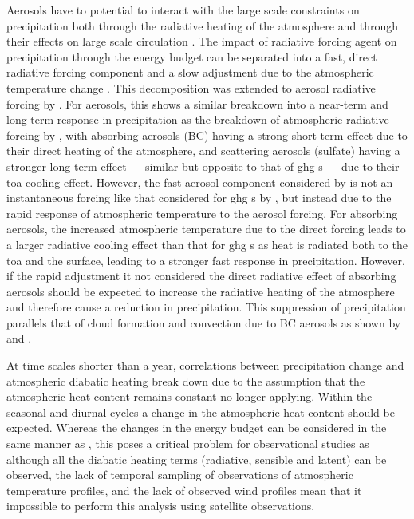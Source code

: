 Aerosols have to potential to interact with the large scale constraints on precipitation both through the radiative heating of the atmosphere \citep{suzuki_perturbations_2019} and through their effects on large scale circulation \citep{bollasina_anthropogenic_2011, nober_sensitivity_2003}. 
The impact of radiative forcing agent on precipitation through the energy budget can be separated into a fast, direct radiative forcing component and a slow adjustment due to the atmospheric temperature change \citep{allen_constraints_2002}. This decomposition was extended to aerosol radiative forcing by \citet{richardson_drivers_2018}. For aerosols, this shows a similar breakdown into a near-term and long-term response in precipitation as the breakdown of atmospheric radiative forcing by \citet{suzuki_perturbations_2019}, with absorbing aerosols (BC) having a strong short-term effect due to their direct heating of the atmosphere, and scattering aerosols (sulfate) having a stronger long-term effect --- similar but opposite to that of \acrshort{ghg} s --- due to their \acrshort{toa}  cooling effect.
However, the fast aerosol component considered by \citet{richardson_drivers_2018} is not an instantaneous forcing like that considered for \acrshort{ghg} s by \citet{allen_constraints_2002}, but instead due to the rapid response of atmospheric temperature to the aerosol forcing.
For absorbing aerosols, the increased atmospheric temperature due to the direct forcing leads to a larger radiative cooling effect than that for \acrshort{ghg} s as heat is radiated both to the \acrshort{toa}  and the surface, leading to a stronger fast response in precipitation. 
However, if the rapid adjustment it not considered the direct radiative effect of absorbing aerosols should be expected to increase the radiative heating of the atmosphere and therefore cause a reduction in precipitation.
This suppression of precipitation parallels that of cloud formation and convection due to BC aerosols as shown by \citet{koren_smoke_2008} and \citet{fan_effects_2008}.

At time scales shorter than a year, correlations between precipitation change and atmospheric diabatic heating break down \citep{nogueira_multi-scale_2019} due to the assumption that the atmospheric heat content remains constant no longer applying.
Within the seasonal and diurnal cycles a change in the atmospheric heat content should be expected.
Whereas the changes in the energy budget can be considered in the same manner as \citet{muller_energetic_2011}, this poses a critical problem for observational studies as although all the diabatic heating terms (radiative, sensible and latent) can be observed, the lack of temporal sampling of observations of atmospheric temperature profiles, and the lack of observed wind profiles mean that it impossible to perform this analysis using satellite observations.



